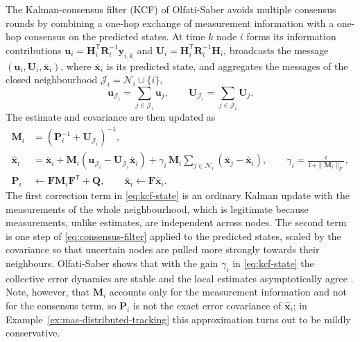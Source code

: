 \documentclass[graybox,envcountchap]{style/SNmono}
\begin{document}
The Kalman-consensus filter (KCF) of Olfati-Saber \cite{olfatisaber2007_dkf} avoids multiple consensus rounds by combining a one-hop exchange of measurement information with a one-hop consensus on the predicted states. At time $k$ node $i$ forms its information contributions $\mathbf{u}_i=\mathbf{H}_i^{\mathsf T}\mathbf{R}_i^{-1}\mathbf{y}_{i,k}$ and $\mathbf{U}_i=\mathbf{H}_i^{\mathsf T}\mathbf{R}_i^{-1}\mathbf{H}_i$, broadcasts the message $(\mathbf{u}_i,\mathbf{U}_i,\bar{\mathbf{x}}_i)$, where $\bar{\mathbf{x}}_i$ is its predicted state, and aggregates the messages of the closed neighbourhood $\mathcal{J}_i=\mathcal{N}_i\cup\{i\}$,
\begin{equation}
\mathbf{u}_{\mathcal{J}_i}=\sum_{j\in\mathcal{J}_i}\mathbf{u}_j,\qquad
\mathbf{U}_{\mathcal{J}_i}=\sum_{j\in\mathcal{J}_i}\mathbf{U}_j .
\label{eq:kcf-aggregate}
\end{equation}
The estimate and covariance are then updated as
\begin{align}
\mathbf{M}_i&=\left(\mathbf{P}_i^{-1}+\mathbf{U}_{\mathcal{J}_i}\right)^{-1},\label{eq:kcf-cov}\\
\widehat{\mathbf{x}}_i&=\bar{\mathbf{x}}_i+\mathbf{M}_i\left(\mathbf{u}_{\mathcal{J}_i}-\mathbf{U}_{\mathcal{J}_i}\bar{\mathbf{x}}_i\right)+\gamma_i\,\mathbf{M}_i\sum_{j\in\mathcal{N}_i}\left(\bar{\mathbf{x}}_j-\bar{\mathbf{x}}_i\right),\qquad \gamma_i=\frac{\epsilon}{1+\|\mathbf{M}_i\|_{F}},\label{eq:kcf-state}\\
\mathbf{P}_i&\leftarrow\mathbf{F}\mathbf{M}_i\mathbf{F}^{\mathsf T}+\mathbf{Q},\qquad \bar{\mathbf{x}}_i\leftarrow\mathbf{F}\widehat{\mathbf{x}}_i .\label{eq:kcf-predict}
\end{align}
The first correction term in \eqref{eq:kcf-state} is an ordinary Kalman update with the measurements of the whole neighbourhood, which is legitimate because measurements, unlike estimates, are independent across nodes. The second term is one step of \eqref{eq:consensus-filter} applied to the predicted states, scaled by the covariance so that uncertain nodes are pulled more strongly towards their neighbours. Olfati-Saber shows that with the gain $\gamma_i$ in \eqref{eq:kcf-state} the collective error dynamics are stable and the local estimates asymptotically agree \cite{olfatisaber2007_dkf}. Note, however, that $\mathbf{M}_i$ accounts only for the measurement information and not for the consensus term, so $\mathbf{P}_i$ is not the exact error covariance of $\widehat{\mathbf{x}}_i$; in Example~\ref{ex:mas-distributed-tracking} this approximation turns out to be mildly conservative.
\end{document}
